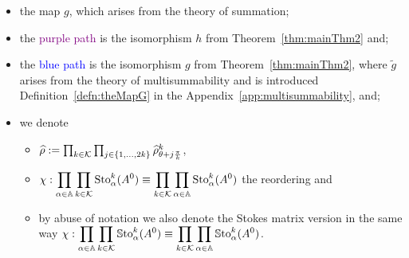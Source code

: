 \begin{itemize}
  \item the map $g$, which arises from the theory of summation;
  \item the \textcolor{purple}{purple path} is the isomorphism $h$ from
    Theorem~\ref{thm:mainThm2} and;
  \item the \textcolor{blue}{blue path} is the isomorphism $g$ from
    Theorem~\ref{thm:mainThm2}, where $\tilde g$ arises from the theory of
    multisummability and is introduced Definition~\ref{defn:theMapG} in the
    Appendix~\ref{app:multisummability}, and;
  \item we denote
    \begin{itemize}
      \item $\widehat\rho:=\prod_{k\in\mathcal{K}}\prod_{j\in\{1,\dots,2k\}}\widehat\rho_{\theta+j\frac{\pi}{k}}^k$,
      \item $\chi:\displaystyle \prod_{\alpha\in\mathbb{A}}\prod_{k\in\mathcal{K}}\operatorname{Sto}_\alpha^k(A^0)
        \equiv\displaystyle \prod_{k\in\mathcal{K}}\prod_{\alpha\in\mathbb{A}}\operatorname{Sto}_\alpha^k(A^0)$
        the reordering and
      \item by abuse of notation we also denote the Stokes matrix version in
        the same way
        $\chi:\displaystyle \prod_{\alpha\in\mathbb{A}}\prod_{k\in\mathcal{K}}\operatorname{\mathbb{S}to}_\alpha^k(A^0)
        \equiv\displaystyle
        \prod_{k\in\mathcal{K}}\prod_{\alpha\in\mathbb{A}}\operatorname{\mathbb{S}to}_\alpha^k(A^0)$.
    \end{itemize}
\end{itemize}

